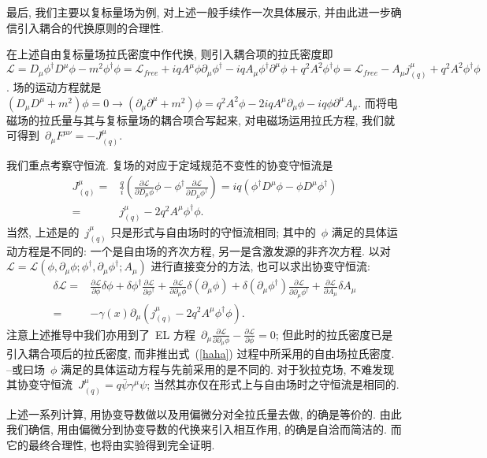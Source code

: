 最后, 我们主要以复标量场为例, 对上述一般手续作一次具体展示, 并由此进一步确信引入耦合的代换原则的合理性.

在上述自由复标量场拉氏密度中作代换, 则引入耦合项的拉氏密度即~$\mathcal{L}=D_\mu\phi^\dag D^\mu\phi-m^2\phi^\dag\phi=\mathcal{L}_{free}+iqA^\mu\phi\partial_\mu\phi^\dag-iqA_\mu\phi^\dag\partial^\mu\phi+q^2A^2\phi^\dag\phi=\mathcal{L}_{free}-A_\mu j^\mu_{(q)}+q^2A^2\phi^\dag\phi$. 场的运动方程就是~$(D_\mu D^\mu+m^2)\phi=0\rightarrow(\partial_\mu\partial^\mu+m^2)\phi=q^2A^2\phi-2iqA^\mu\partial_\mu\phi-iq\phi\partial^\mu A_\mu$. 而将电磁场的拉氏量与其与复标量场的耦合项合写起来, 对电磁场运用拉氏方程, 我们就可得到~$\partial_\mu F^{\mu\nu}=-J^\mu_{(q)}$.

我们重点考察守恒流. 复场的对应于定域规范不变性的协变守恒流是
\begin{align}
J^\mu_{(q)}=&\frac{q}{i}\left(\frac{\partial\mathcal{L}}{\partial D_\mu\phi}\phi-\phi^\dag\frac{\partial\mathcal{L}}{\partial D_\mu\phi^\dag}\right)=iq(\phi^\dag D^\mu\phi-\phi D^\mu\phi^\dag)\nonumber\\
=&j^\mu_{(q)}-2q^2A^\mu\phi^\dag\phi.
\end{align}
当然, 上述是的~$j^\mu_{(q)}$ 只是形式与自由场时的守恒流相同; 其中的~$\phi$ 满足的具体运动方程是不同的: 一个是自由场的齐次方程, 另一是含激发源的非齐次方程. 以对~$\mathcal{L}=\mathcal{L}(\phi,\partial_\mu\phi;\phi^\dag,\partial_\mu\phi^\dag;A_\mu)$ 进行直接变分的方法, 也可以求出协变守恒流:
\begin{align}
\delta\mathcal{L}=&\frac{\partial\mathcal{L}}{\partial\phi}\delta\phi+\delta\phi^\dag\frac{\partial\mathcal{L}}{\partial\phi^\dag}
+\frac{\partial\mathcal{L}}{\partial\partial_\mu\phi}\delta(\partial_\mu\phi)+\delta(\partial_\mu\phi^\dag)\frac{\partial\mathcal{L}}{\partial\partial_\mu\phi^\dag}+\frac{\partial\mathcal{L}}{\partial A_\mu}\delta A_\mu\nonumber\\
=&-\gamma(x)\partial_\mu \left(j^\mu_{(q)}-2q^2A^\mu\phi^\dag\phi\right).
\end{align}
注意上述推导中我们亦用到了~EL 方程~$\partial_\mu\frac{\partial\mathcal{L}}{\partial\partial_\mu\phi}-\frac{\partial\mathcal{L}}{\partial\phi}=0$; 但此时的拉氏密度已是引入耦合项后的拉氏密度, 而非推出式~(\ref{haha}) 过程中所采用的自由场拉氏密度. --或曰场~$\phi$ 满足的具体运动方程与先前采用的是不同的. 对于狄拉克场, 不难发现其协变守恒流~$J^\mu_{(q)}=q\bar{\psi}\gamma^\mu\psi$; 当然其亦仅在形式上与自由场时之守恒流是相同的.

上述一系列计算, 用协变导数做以及用偏微分对全拉氏量去做, 的确是等价的. 由此我们确信, 用由偏微分到协变导数的代换来引入相互作用, 的确是自洽而简洁的. 而它的最终合理性, 也将由实验得到完全证明.






